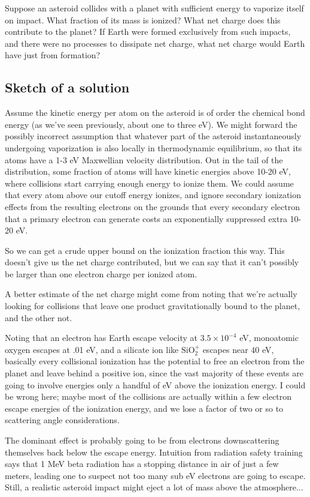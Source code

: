 \documentclass[12pt]{article}
\begin{document}
Suppose an asteroid collides with a planet with sufficient energy to vaporize itself on impact. What fraction of its mass is ionized? What net charge does this contribute to the planet? If Earth were formed exclusively from such impacts, and there were no processes to dissipate net charge, what net charge would Earth have just from formation?



\subsection{Sketch of a solution}

Assume the kinetic energy per atom on the asteroid is of order the chemical bond energy (as we've seen previously, about one to three eV). We might forward the possibly incorrect assumption that whatever part of the asteroid instantaneously undergoing vaporization is also locally in thermodynamic equilibrium, so that its atoms have a 1-3 eV Maxwellian velocity distribution. Out in the tail of the distribution, some fraction of atoms will have kinetic energies above 10-20 eV, where collisions start carrying enough energy to ionize them. We could assume that every atom above our cutoff energy ionizes, and ignore secondary ionization effects from the resulting electrons on the grounds that every secondary electron that a primary electron can generate costs an exponentially suppressed extra 10-20 eV.

So we can get a crude upper bound on the ionization fraction this way. This doesn't give us the net charge contributed, but we can say that it can't possibly be larger than one electron charge per ionized atom.

A better estimate of the net charge might come from noting that we're actually looking for collisions that leave one product gravitationally bound to the planet, and the other not.

Noting that an electron has Earth escape velocity at \(3.5 \times 10^{-4}\) eV, monoatomic oxygen escapes at .01 eV, and a silicate ion like \(\mathrm{Si}\mathrm{O}_2^+\) escapes near 40 eV, basically every collisional ionization has the potential to free an electron from the planet and leave behind a positive ion, since the vast majority of these events are going to involve energies only a handful of eV above the ionization energy. I could be wrong here; maybe most of the collisions are actually within a few electron escape energies of the ionization energy, and we lose a factor of two or so to scattering angle considerations.

The dominant effect is probably going to be from electrons downscattering themselves back below the escape energy. Intuition from radiation safety training says that 1 MeV beta radiation has a stopping distance in air of just a few meters, leading one to suspect not too many sub eV electrons are going to escape. Still, a realistic asteroid impact might eject a lot of mass above the atmosphere...



 
 
\end{document}
